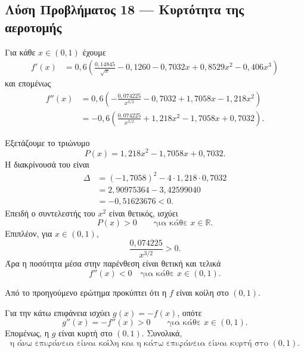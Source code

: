 \subsection*{Λύση Προβλήματος 18 --- Κυρτότητα της αεροτομής }

\begin{alist}
  \item Για κάθε $x\in(0,1)$ έχουμε
        \begin{align*}
          f'(x)
          &=0{,}6\left(
            \frac{0{,}14845}{\sqrt{x}}
            -0{,}1260-0{,}7032x
            +0{,}8529x^2-0{,}406x^3
          \right)
        \end{align*}
        και επομένως
        \begin{align*}
          f''(x)
          &=0{,}6\left(
            -\frac{0{,}074225}{x^{3/2}}
            -0{,}7032+1{,}7058x-1{,}218x^2
          \right)\\
          &=-0{,}6\left(
            \frac{0{,}074225}{x^{3/2}}
            +1{,}218x^2-1{,}7058x+0{,}7032
          \right).
        \end{align*}

        Εξετάζουμε το τριώνυμο
        \[
          P(x)=1{,}218x^2-1{,}7058x+0{,}7032.
        \]
        Η διακρίνουσά του είναι
        \begin{align*}
          \Delta
          &=(-1{,}7058)^2
            -4\cdot1{,}218\cdot0{,}7032\\
          &=2{,}90975364-3{,}42599040\\
          &=-0{,}51623676<0.
        \end{align*}
        Επειδή ο συντελεστής του $x^2$ είναι θετικός, ισχύει
        \[
          P(x)>0
          \qquad\text{για κάθε }x\in\mathbb{R}.
        \]
        Επιπλέον, για $x\in(0,1)$,
        \[
          \frac{0{,}074225}{x^{3/2}}>0.
        \]
        Άρα η ποσότητα μέσα στην παρένθεση είναι θετική και τελικά
        \[
          {f''(x)<0\quad\text{για κάθε }x\in(0,1)}.
        \]

  \item Από το προηγούμενο ερώτημα προκύπτει ότι η $f$ είναι κοίλη στο
        $(0,1)$.

        Για την κάτω επιφάνεια ισχύει $g(x)=-f(x)$, οπότε
        \[
          g''(x)=-f''(x)>0
          \qquad\text{για κάθε }x\in(0,1).
        \]
        Επομένως, η $g$ είναι κυρτή στο $(0,1)$. Συνολικά,
        \[
          {\text{η άνω επιφάνεια είναι κοίλη και η κάτω επιφάνεια
          είναι κυρτή στο }(0,1)}.
        \]


\end{alist}
